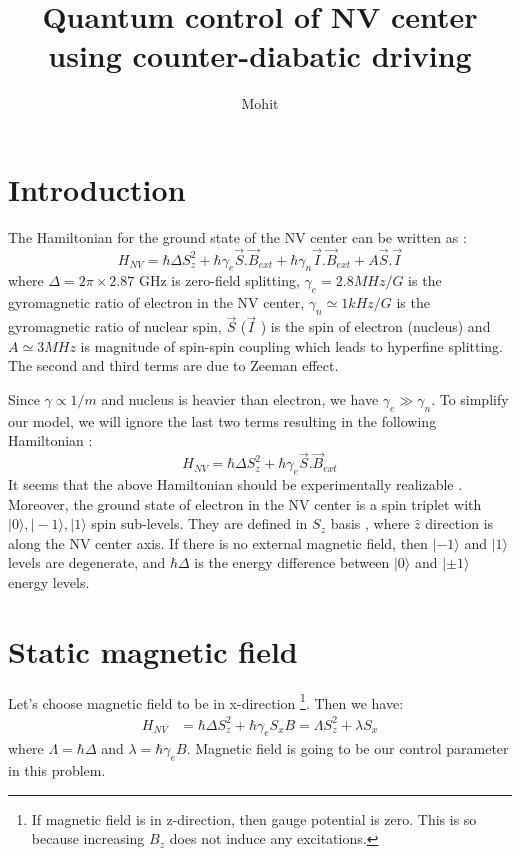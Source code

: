 \documentclass[11pt,a4paper]{article}
\author{Mohit}
\title{Quantum control of NV center using counter-diabatic driving  }
\begin{document}
\maketitle

\section{Introduction}
 The Hamiltonian for the ground state of the NV center can be written as :
\begin{equation}
H_{NV}= \hbar \Delta S_z^2 + \hbar \gamma_e \vec{S}. \vec{B}_{ext} +  \hbar \gamma_n \vec{I}. \vec{B}_{ext} + A \vec{S}. \vec{I}
\end{equation}
where $\Delta= 2 \pi \times 2.87 $ GHz is zero-field splitting, $\gamma_e =2.8 MHz/G$ is the gyromagnetic ratio of electron in the NV center, $\gamma_n \simeq 1 kHz/G$ is the gyromagnetic ratio of nuclear spin, $\vec{S}$ ($\vec{I}$ ) is the spin of electron (nucleus) and $A \simeq 3 MHz$ is magnitude of spin-spin coupling which leads to hyperfine splitting. The second and third terms are due to Zeeman effect.

Since $\gamma \propto 1/m$ and nucleus is heavier than electron, we have $\gamma_e \gg \gamma_n$. To simplify our model, we will ignore the last two terms resulting in the following Hamiltonian :
\begin{equation}
H_{NV}= \hbar \Delta S_z^2 + \hbar \gamma_e \vec{S}. \vec{B}_{ext} 
\end{equation}
It seems that the above Hamiltonian should be experimentally realizable \cite{dhingra2017nitrogen}. Moreover, the ground state of electron in the NV center is a spin triplet with $| 0 \rangle, | -1 \rangle, | 1 \rangle$ spin sub-levels. They are defined in $S_z$ basis , where $\hat{z}$ direction is along the NV center axis. If there is no external magnetic field, then $| -1 \rangle$ and $| 1 \rangle$ levels are degenerate, and  $ \hbar \Delta$ is the energy difference between $| 0 \rangle$ and $| \pm 1 \rangle$ energy levels.

\section{Static magnetic field}

Let's choose magnetic field to be in x-direction \footnote{If magnetic field is in z-direction, then gauge potential is zero. This is so because increasing $B_z$ does not induce any excitations. }. Then we have:
\begin{align*}
H_{NV} &= \hbar \Delta S_z^2 + \hbar \gamma_e   S_x  B = \Lambda S_z^2 + \lambda   S_x  
\end{align*}
where $\Lambda= \hbar \Delta $ and $\lambda=\hbar \gamma_e B $. Magnetic field is going to be our control parameter in this problem. 
\end{document}
